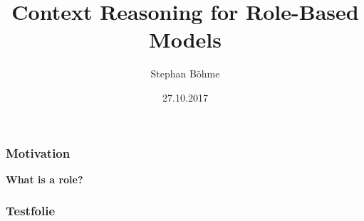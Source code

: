 \documentclass[t,final,nototalpages]{tudbeamer}
\title{Context Reasoning for Role-Based Models}
\author{Stephan Böhme}
\date{27.10.2017}
\renewcommand*{\framesubtitle}[1]{\textcolor{frametitle}{\textbf{#1}}}
\begin{document}
\makeatletter
\renewcommand{\@slide}{}
\makeatother

\begin{frame}
  \frametitle*{Motivation}
  \framesubtitle{What is a role?}
 
\end{frame}

\begin{frame}
  \frametitle{Testfolie}
  \cite{KuLG-SLE14}

  \cite{KBG-SLE15}
\end{frame}
\end{document}
